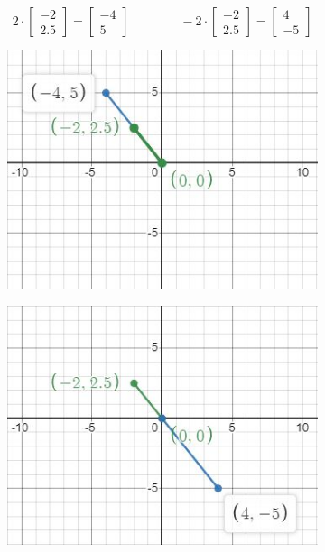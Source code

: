 \documentclass[
	11pt, %
	fleqn, %
	a4paper, %
]{LegrandOrangeBook}
\begin{document}
$$
	2\cdot\begin{bmatrix}
		-2 \\ 2.5
	\end{bmatrix} = \begin{bmatrix} -4 \\5 \end{bmatrix} \quad\quad\quad\quad -2\cdot\begin{bmatrix} -2 \\ 2.5 \end{bmatrix} = \begin{bmatrix} 4 \\ -5 \end{bmatrix}
$$

\begin{figure}[h]
	\caption{Green vector scaled by a factor of 2 (left) and -2 (right)}
	\centering
	\begin{subfigure}[b]{0.49\textwidth}
		\centering
		\includegraphics[scale = 0.72]{Images/scalarMult.JPG}
	\end{subfigure}
	\hfill
	\begin{subfigure}[b]{0.49\textwidth}
		\centering
		\includegraphics[scale = 0.72]{Images/scalarNegMult.JPG}
	\end{subfigure}
\end{figure}
\end{document}
